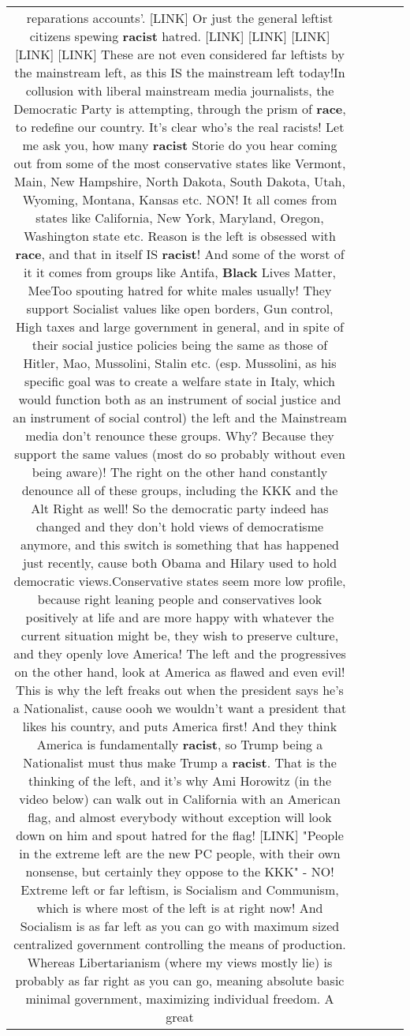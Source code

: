 \documentclass[11pt]{article}
\newlength\mylength
\begin{document}
\begin{center}
\begin{longtable}{|C{.65\mylength}|C{.30\mylength}|C{.12\mylength}|C{.12\mylength}|C{.12\mylength}|}
reparations accounts'.  [LINK] Or just the general leftist citizens spewing \textbf{racist} hatred. [LINK]  [LINK]  [LINK]  [LINK]  [LINK] These are not even considered far leftists by the mainstream left, as this IS the mainstream left today!In collusion with liberal mainstream media journalists, the Democratic Party is attempting, through the prism of \textbf{race}, to redefine our country. It's clear who's the real racists! Let me ask you, how many \textbf{racist} Storie do you hear coming out from some of the most conservative states like Vermont, Main, New Hampshire, North Dakota, South Dakota, Utah, Wyoming, Montana, Kansas etc. NON! It all comes from states like California, New York, Maryland, Oregon, Washington state etc. Reason is the left is obsessed with \textbf{race}, and that in itself IS \textbf{racist}! And some of the worst of it it comes from groups like Antifa, \textbf{Black} Lives Matter, MeeToo spouting hatred for white males usually! They support Socialist values like open borders, Gun control, High taxes and large government in general, and in spite of their social justice policies being the same as those of Hitler, Mao, Mussolini, Stalin etc. (esp. Mussolini, as his specific goal was to create a welfare state in Italy, which would function both as an instrument of social justice and an instrument of social control) the left and the Mainstream media don't renounce these groups. Why? Because they support the same values (most do so probably without even being aware)! The right on the other hand constantly denounce all of these groups, including the KKK and the Alt Right as well! So the democratic party indeed has changed and they don't hold views of democratisme anymore, and this switch is something that has happened just recently, cause both Obama and Hilary used to hold democratic views.Conservative states seem more low profile, because right leaning people and conservatives look positively at life and are more happy with whatever the current situation might be, they wish to preserve culture, and they openly love America! The left and the progressives on the other hand, look at America as flawed and even evil! This is why the left freaks out when the president says he's a Nationalist, cause oooh we wouldn't want a president that likes his country, and puts America first! And they think America is fundamentally \textbf{racist}, so Trump being a Nationalist must thus make Trump a \textbf{racist}. That is the thinking of the left, and it's why Ami Horowitz (in the video below) can walk out in California with an American flag, and almost everybody without exception will look down on him and spout hatred for the flag! [LINK] "People in the extreme left are the new PC people, with their own nonsense, but certainly they oppose to the KKK" - NO! Extreme left or far leftism, is Socialism and Communism, which is where most of the left is at right now! And Socialism is as far left as you can go with maximum sized centralized government controlling the means of production. Whereas Libertarianism (where my views mostly lie) is probably as far right as you can go, meaning absolute basic minimal government, maximizing individual freedom. A great 
\end{longtable}
\end{center}
\end{document}
